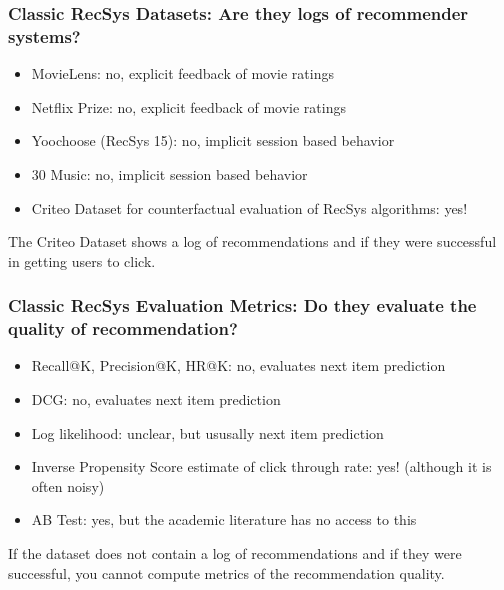  \begin{frame}
  \frametitle{Classic RecSys Datasets: Are they logs of recommender systems?}

  \begin{itemize}
    \item MovieLens: \pause no, explicit feedback of movie ratings \pause
    \item Netflix Prize: \pause no, explicit feedback of movie ratings \pause
    \item Yoochoose (RecSys 15): \pause no, implicit session based behavior \pause
    \item 30 Music: \pause no, implicit session based behavior \pause
    \item Criteo Dataset for counterfactual evaluation of RecSys algorithms: \pause yes!
  \end{itemize}

  \pause
  The Criteo Dataset shows a log of recommendations and if they were successful in getting users to click.  
\end{frame}



\begin{frame}
  \frametitle{Classic RecSys Evaluation Metrics: Do they evaluate the quality of recommendation?}

  \begin{itemize}
    \item Recall@K, Precision@K, HR@K:  \pause no, evaluates next item prediction \pause
    \item DCG:   \pause no, evaluates next item prediction \pause
    \item Log likelihood: \pause  unclear, but ususally next item prediction \pause
    \item Inverse Propensity Score estimate of click through rate: \pause yes! (although it is often noisy) \pause
    \item AB Test: \pause yes, but the academic literature has no access to this
  \end{itemize}

  \pause
If the dataset does not contain a log of recommendations and if they were successful, you cannot compute metrics of the recommendation quality.
\end{frame}


